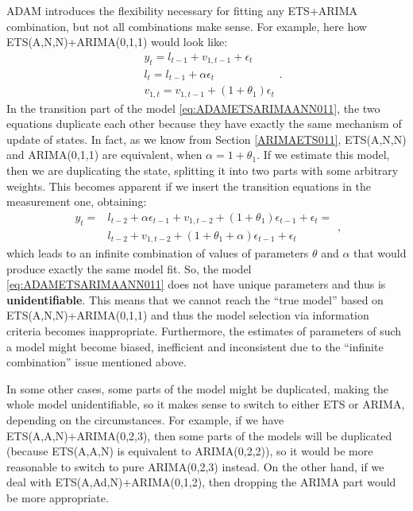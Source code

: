 \documentclass[]{book}
\theoremstyle{definition}
\theoremstyle{definition}
\theoremstyle{definition}
\theoremstyle{definition}
\theoremstyle{remark}
\begin{document}
ADAM introduces the flexibility necessary for fitting any ETS+ARIMA combination, but not all combinations make sense. For example, here how ETS(A,N,N)+ARIMA(0,1,1) would look like:
\begin{equation}
  \begin{aligned}
    &{y}_{t} = l_{t-1} + v_{1,t-1} + \epsilon_t \\
    &l_t = l_{t-1} + \alpha \epsilon_t \\
    &v_{1,t} = v_{1,t-1} + (1+\theta_1) \epsilon_t
  \end{aligned}.
  \label{eq:ADAMETSARIMAANN011}
\end{equation}
In the transition part of the model \eqref{eq:ADAMETSARIMAANN011}, the two equations duplicate each other because they have exactly the same mechanism of update of states. In fact, as we know from Section \ref{ARIMAETS011}, ETS(A,N,N) and ARIMA(0,1,1) are equivalent, when \(\alpha=1+\theta_1\). If we estimate this model, then we are duplicating the state, splitting it into two parts with some arbitrary weights. This becomes apparent if we insert the transition equations in the measurement one, obtaining:
\begin{equation}
  \begin{aligned}
    {y}_{t} = & l_{t-2} + \alpha \epsilon_{t-1} + v_{1,t-2} + (1+\theta_1) \epsilon_{t-1} + \epsilon_t =\\
    & l_{t-2} + v_{1,t-2} + (1+\theta_1+\alpha) \epsilon_{t-1} + \epsilon_t
  \end{aligned},
  \label{eq:ADAMETSARIMAANN011Measurement}
\end{equation}
which leads to an infinite combination of values of parameters \(\theta\) and \(\alpha\) that would produce exactly the same model fit. So, the model \eqref{eq:ADAMETSARIMAANN011} does not have unique parameters and thus is \textbf{unidentifiable}. This means that we cannot reach the ``true model'' based on ETS(A,N,N)+ARIMA(0,1,1) and thus the model selection via information criteria becomes inappropriate. Furthermore, the estimates of parameters of such a model might become biased, inefficient and inconsistent due to the ``infinite combination'' issue mentioned above.

In some other cases, some parts of the model might be duplicated, making the whole model unidentifiable, so it makes sense to switch to either ETS or ARIMA, depending on the circumstances. For example, if we have ETS(A,A,N)+ARIMA(0,2,3), then some parts of the models will be duplicated (because ETS(A,A,N) is equivalent to ARIMA(0,2,2)), so it would be more reasonable to switch to pure ARIMA(0,2,3) instead. On the other hand, if we deal with ETS(A,Ad,N)+ARIMA(0,1,2), then dropping the ARIMA part would be more appropriate.
\end{document}
